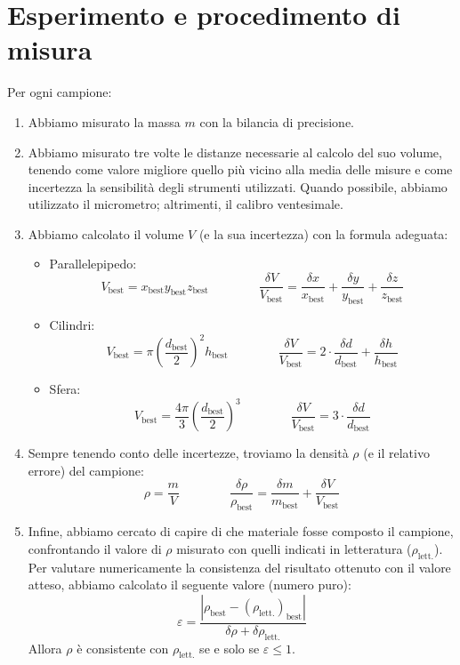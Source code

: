 \documentclass{article}
\begin{document}
\section{Esperimento e procedimento di misura}
Per ogni campione:
\begin{enumerate}
    \item Abbiamo misurato la massa $m$ con la bilancia di precisione.
    \item Abbiamo misurato tre volte le distanze necessarie al calcolo
          del suo volume, tenendo come valore migliore quello più vicino alla media
          delle misure e come incertezza la sensibilità degli strumenti utilizzati.
          Quando possibile, abbiamo utilizzato il micrometro; altrimenti, il calibro ventesimale.
    \item Abbiamo calcolato il volume $V$ (e la sua incertezza) con la formula adeguata:
    \begin{itemize}
        \item Parallelepipedo:
            \[
                V_\text{best} = x_\text{best} y_\text{best} z_\text{best}
                \qquad\qquad
                \frac{\delta V}{V_\text{best}} = \frac{\delta x}{x_\text{best}} + \frac{\delta y}{y_\text{best}} + \frac{\delta z}{z_\text{best}}
            \]
        \item Cilindri:
            \[
                V_\text{best} = \pi \left(\frac{d_\text{best}}{2}\right)^2 h_\text{best}
                \qquad\qquad
                \frac{\delta V}{V_\text{best}} = 2 \cdot \frac{\delta d}{d_\text{best}} + \frac{\delta h}{h_\text{best}}
            \]
        \item Sfera:
            \[
                V_\text{best} = \frac{4 \pi}{3} \left(\frac{d_\text{best}}{2}\right)^3
                \qquad\qquad
                \frac{\delta V}{V_\text{best}} = 3 \cdot \frac{\delta d}{d_\text{best}}
            \]
    \end{itemize}
    \item Sempre tenendo conto delle incertezze, troviamo la densità $\rho$ (e il relativo errore) del campione:
        \[
            \rho = \frac{m}{V}
            \qquad\qquad
            \frac{\delta \rho}{\rho_\text{best}} = \frac{\delta m}{m_\text{best}} + \frac{\delta V}{V_\text{best}}
        \]
    \item Infine, abbiamo cercato di capire di che materiale fosse composto il campione, confrontando
    il valore di $\rho$ misurato con quelli indicati in letteratura ($\rho_\text{lett.}$).
    Per valutare numericamente la consistenza del risultato ottenuto con il valore atteso,
    abbiamo calcolato il seguente valore (numero puro):
    \[\varepsilon = \frac{\left|\rho_\text{best} - \left(\rho_\text{lett.}\right)_\text{best}\right|}{\delta \rho + \delta \rho_\text{lett.}}\]
    Allora $\rho$ è consistente con $\rho_\text{lett.}$ se e solo se $\varepsilon \le 1$.
\end{enumerate}
\end{document}
